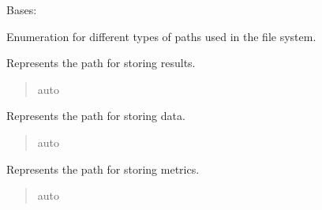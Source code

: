 \documentclass[letterpaper,10pt,english]{sphinxmanual}
\begin{document}
\begin{fulllineitems}
\label{\detokenize{domain.enums:domain.enums.PathKey.PathKey}}
\pysigstartsignatures
{}
\pysigstopsignatures
\sphinxAtStartPar
Bases: 

\sphinxAtStartPar
Enumeration for different types of paths used in the file system.

\begin{fulllineitems}
\label{\detokenize{domain.enums:domain.enums.PathKey.PathKey.RESULTS}}
\pysigstartsignatures
{}
\pysigstopsignatures
\sphinxAtStartPar
Represents the path for storing results.
\begin{quote}\begin{description}
\sphinxAtStartPar
auto

\end{description}\end{quote}

\end{fulllineitems}


\begin{fulllineitems}
\label{\detokenize{domain.enums:domain.enums.PathKey.PathKey.DATA}}
\pysigstartsignatures
{}
\pysigstopsignatures
\sphinxAtStartPar
Represents the path for storing data.
\begin{quote}\begin{description}
\sphinxAtStartPar
auto

\end{description}\end{quote}

\end{fulllineitems}


\begin{fulllineitems}
\label{\detokenize{domain.enums:domain.enums.PathKey.PathKey.METRICS}}
\pysigstartsignatures
{}
\pysigstopsignatures
\sphinxAtStartPar
Represents the path for storing metrics.
\begin{quote}\begin{description}
\sphinxAtStartPar
auto


\end{description}
\end{quote}
\end{fulllineitems}
\end{fulllineitems}
\end{document}
